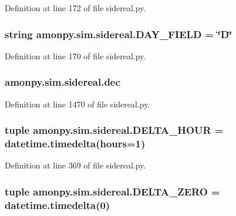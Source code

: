 Definition at line 172 of file sidereal.\-py.

\hypertarget{namespaceamonpy_1_1sim_1_1sidereal_ac01daf2e3ea4cf146f758cb9beab4b80}{
\subsubsection[{D\-A\-Y\-\_\-\-F\-I\-E\-L\-D}]{\setlength{\rightskip}{0pt plus 5cm}string amonpy.\-sim.\-sidereal.\-D\-A\-Y\-\_\-\-F\-I\-E\-L\-D = \char`\"{}D\char`\"{}}}\label{namespaceamonpy_1_1sim_1_1sidereal_ac01daf2e3ea4cf146f758cb9beab4b80}


Definition at line 170 of file sidereal.\-py.

\hypertarget{namespaceamonpy_1_1sim_1_1sidereal_afecc68b3348d79c934a33ea9918e68ff}{
\subsubsection[{dec}]{\setlength{\rightskip}{0pt plus 5cm}amonpy.\-sim.\-sidereal.\-dec}}\label{namespaceamonpy_1_1sim_1_1sidereal_afecc68b3348d79c934a33ea9918e68ff}


Definition at line 1470 of file sidereal.\-py.

\hypertarget{namespaceamonpy_1_1sim_1_1sidereal_a3766f520ebede113a6af900f31cad78c}{
\subsubsection[{D\-E\-L\-T\-A\-\_\-\-H\-O\-U\-R}]{\setlength{\rightskip}{0pt plus 5cm}tuple amonpy.\-sim.\-sidereal.\-D\-E\-L\-T\-A\-\_\-\-H\-O\-U\-R = datetime.\-timedelta({\bf hours}=1)}}\label{namespaceamonpy_1_1sim_1_1sidereal_a3766f520ebede113a6af900f31cad78c}


Definition at line 369 of file sidereal.\-py.

\hypertarget{namespaceamonpy_1_1sim_1_1sidereal_ab96063e65dbd73e9f896b953e10576b3}{
\subsubsection[{D\-E\-L\-T\-A\-\_\-\-Z\-E\-R\-O}]{\setlength{\rightskip}{0pt plus 5cm}tuple amonpy.\-sim.\-sidereal.\-D\-E\-L\-T\-A\-\_\-\-Z\-E\-R\-O = datetime.\-timedelta(0)}}\label{namespaceamonpy_1_1sim_1_1sidereal_ab96063e65dbd73e9f896b953e10576b3}


